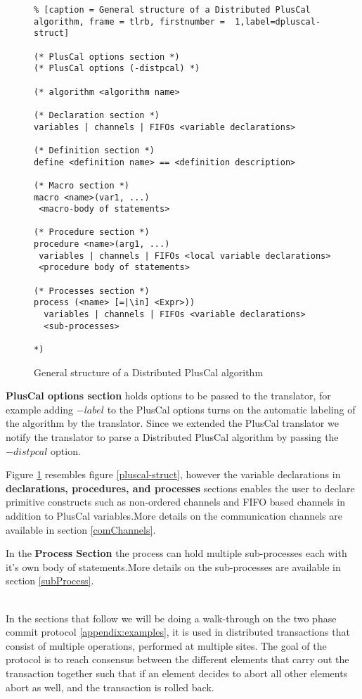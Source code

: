 \documentclass{thesul}
\begin{document}
\begin{figure}
\begin{lstlisting}% [caption = General structure of a Distributed PlusCal algorithm, frame = tlrb, firstnumber =  1,label=dpluscal-struct]

(* PlusCal options section *)
(* PlusCal options (-distpcal) *)

(* algorithm <algorithm name>

(* Declaration section *)
variables | channels | FIFOs <variable declarations>

(* Definition section *)
define <definition name> == <definition description>

(* Macro section *)
macro <name>(var1, ...)
 <macro-body of statements>

(* Procedure section *)
procedure <name>(arg1, ...)
 variables | channels | FIFOs <local variable declarations>
 <procedure body of statements>

(* Processes section *)
process (<name> [=|\in] <Expr>))
  variables | channels | FIFOs <variable declarations>
  <sub-processes>

*)

\end{lstlisting}
\caption{General structure of a Distributed PlusCal algorithm}
\label{dpluscal-struct}
\end{figure}

\textbf{PlusCal options section} holds options to be passed to the translator, for example adding $-label$ to the PlusCal options turns on the automatic labeling of the algorithm by the translator. Since we extended the PlusCal translator we notify the translator to parse a Distributed PlusCal algorithm by passing the $-distpcal$ option.

Figure \ref{dpluscal-struct} resembles figure \ref{pluscal-struct}, however the variable declarations in \textbf{declarations, procedures, and processes} sections enables the user to declare primitive constructs such as non-ordered channels and FIFO based channels in addition to PlusCal variables.More details on the communication channels are available in section \ref{comChannels}.

In the \textbf{Process Section} the process can hold multiple sub-processes each with it's own body of statements.More details on the sub-processes are available in section \ref{subProcess}.


\hfill\\
In the sections that follow we will be doing a walk-through on the two phase commit protocol \ref{appendix:examples}, it is used in distributed transactions that consist of multiple operations, performed at multiple sites. The goal of the protocol is to reach consensus between the different elements that carry out the transaction together such that if an element decides to abort all other elements abort as well, and the transaction is rolled back.
\end{document}
